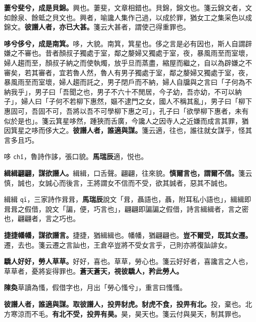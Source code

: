 \textbf{萋兮斐兮，成是貝錦。}{\footnotesize 興也。萋斐，文章相錯也。貝錦，錦文也。箋云錦文者，文如餘泉、餘蚳之貝文也。興者，喻讒人集作己過，以成於罪，猶女工之集采色以成錦文。}\textbf{彼譖人者，亦已大甚。}{\footnotesize 箋云大甚者，謂使己得重罪也。}

\textbf{哆兮侈兮，成是南箕。}{\footnotesize 哆，大貌。南箕，箕星也。侈之言是必有因也，斯人自謂辟嫌之不審也。昔者顏叔子獨處于室，鄰之嫠婦又獨處于室，夜，暴風雨至而室壞，婦人趨而至，顏叔子納之而使執燭，放乎旦而蒸盡，縮屋而繼之，自以為辟嫌之不審矣，若其審者，宜若魯人然，魯人有男子獨處于室，鄰之嫠婦又獨處于室，夜，暴風雨至而室壞，婦人趨而託之，男子閉戶而不納，婦人自牖與之言曰「子何為不納我乎」，男子曰「吾聞之也，男子不六十不閒居，今子幼，吾亦幼，不可以納子」，婦人曰「子何不若柳下惠然，嫗不逮門之女，國人不稱其亂」，男子曰「柳下惠固可，吾固不可，吾將以吾不可學柳下惠之可」，孔子曰「欲學柳下惠者，未有似於是也」。箋云箕星哆然，踵狹而舌廣，今讒人之因寺人之近嫌而成言其罪，猶因箕星之哆而侈大之。}\textbf{彼譖人者，誰適與謀。}{\footnotesize 箋云適，往也，誰往就女謀乎，怪其言多且巧。}

\begin{quoting}哆 \texttt{chǐ}，魯詩作誃，張口貌。\textbf{馬瑞辰}適，悦也。\end{quoting}

\textbf{緝緝翩翩，謀欲譖人。}{\footnotesize 緝緝，口舌聲。翩翩，往來貌。}\textbf{慎爾言也，謂爾不信。}{\footnotesize 箋云慎，誠也，女誠心而後言，王將謂女不信而不受，欲其誠者，惡其不誠也。}

\begin{quoting}緝緝 \texttt{qī}，三家詩作咠咠，\textbf{馬瑞辰}說文「咠，聶語也，聶，附耳私小語也」，緝緝即咠咠之假借，說文「諞，便，巧言也」，翩翩即諞諞之假借，詩言緝緝者，言之密也，翩翩者，言之巧也。\end{quoting}

\textbf{捷捷幡幡，謀欲譖言。}{\footnotesize 捷捷，猶緝緝也。幡幡，猶翩翩也。}\textbf{豈不爾受，既其女遷。}{\footnotesize 遷，去也。箋云遷之言訕也，王倉卒豈將不受女言乎，己則亦將復訕誹女。}

\textbf{驕人好好，勞人草草。}{\footnotesize 好好，喜也。草草，勞心也。箋云好好者，喜讒言之人也，草草者，憂將妄得罪也。}\textbf{蒼天蒼天，視彼驕人，矜此勞人。}

\begin{quoting}\textbf{陳奐}草讀為慅，假借字也，月出「勞心慅兮」，重言曰慅慅。\end{quoting}

\textbf{彼譖人者，誰適與謀。取彼譖人，投畀豺虎。豺虎不食，投畀有北。}{\footnotesize 投，棄也。北方寒涼而不毛。}\textbf{有北不受，投畀有昊。}{\footnotesize 昊，昊天也。箋云付與昊天，制其罪也。}


